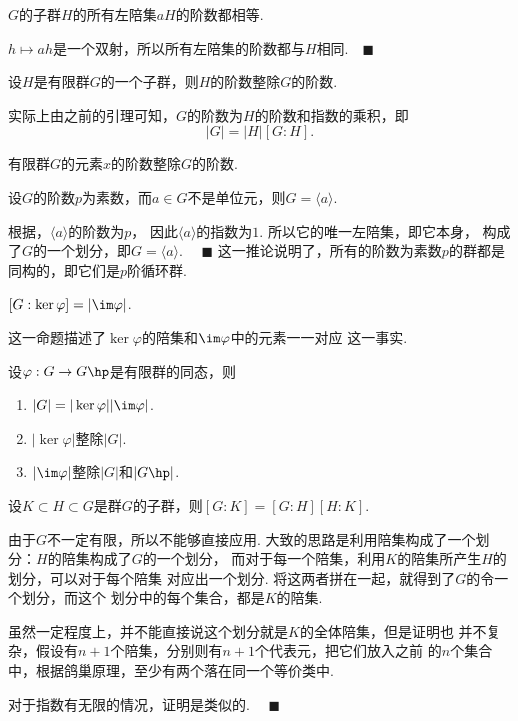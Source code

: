   \begin{lemma}[左陪集与阶]
    $G$的子群$H$的所有左陪集$aH$的阶数都相等.
  \end{lemma}
  \proof
    $h\mapsto ah$是一个双射，所以所有左陪集的阶数都与$H$相同.$\quad\blacksquare$

  \begin{thm}[Lagrange]
    \label{thm: Lagrange}
    设$H$是有限群$G$的一个子群，则$H$的阶数整除$G$的阶数.
  \end{thm}
  \remark
    实际上由之前的引理可知，$G$的阶数为$H$的阶数和指数的乘积，即
    \begin{equation}
      \label{equ: 阶、指数}
      |G| = |H|[G:H].
    \end{equation}

  \begin{cor}
    \label{cor: 元素与群的阶}
    有限群$G$的元素$x$的阶数整除$G$的阶数.
  \end{cor}

  \begin{cor}
    \label{cor: 循环群、素数}
    设$G$的阶数$p$为素数，而$a\in G$不是单位元，则$G=\langle a\rangle$.
  \end{cor}
  \proof
    根据，$\langle a \rangle$的阶数为$p$，
    因此$\langle a\rangle$的指数为$1$. 所以它的唯一左陪集，即它本身，
    构成了$G$的一个划分，即$G=\langle a\rangle$. $\quad\blacksquare$
  \remark
    这一推论说明了，所有的阶数为素数$p$的群都是同构的，即它们是$p$阶循环群.

  \begin{pos}
    $[G:\ker\varphi] = |\im\varphi|$.
  \end{pos}
  \remark
    这一命题描述了$\ker\varphi$的陪集和$\im\varphi$中的元素一一对应
    这一事实.

  \begin{cor}
    \label{cor: 同态、核、像、阶}
    设$\varphi: G\to G\hp$是有限群的同态，则
    \begin{enumerate}
      \item $|G|=|\ker\varphi||\im\varphi|$.
      \item $|\ker\varphi|$整除$|G|$.
      \item $|\im\varphi|$整除$|G|$和$|G\hp|$.
    \end{enumerate}
  \end{cor}

  \begin{thm}[指数可乘性]
    设$K\subset H\subset G$是群$G$的子群，则$[G:K]=[G:H][H:K]$.
  \end{thm}
  \proof
    由于$G$不一定有限，所以不能够直接应用.
    大致的思路是利用陪集构成了一个划分：$H$的陪集构成了$G$的一个划分，
    而对于每一个陪集，利用$K$的陪集所产生$H$的划分，可以对于每个陪集
    对应出一个划分. 将这两者拼在一起，就得到了$G$的令一个划分，而这个
    划分中的每个集合，都是$K$的陪集.\par
    虽然一定程度上，并不能直接说这个划分就是$K$的全体陪集，但是证明也
    并不复杂，假设有$n+1$个陪集，分别则有$n+1$个代表元，把它们放入之前
    的$n$个集合中，根据鸽巢原理，至少有两个落在同一个等价类中.\par
    对于指数有无限的情况，证明是类似的.
    $\quad\blacksquare$

